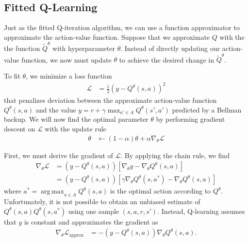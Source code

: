 \documentclass[11pt]{article}
\numberwithin{equation}{section}
\numberwithin{figure}{section}
\DeclareMathOperator*{\argmax}{arg\,max}
\begin{document}
\subsection{Fitted Q-Learning}
Just as the fitted Q-iteration algorithm, we can use a function approximator to
approximate the action-value function. Suppose that we approximate $Q$ with the
the function $\tilde{Q}^\theta$ with hyperparameter $\theta$. Instead of
directly updating our action-value function, we now must update $\theta$ to
achieve the desired change in $\tilde{Q}^\theta$.

To fit $\theta$, we minimize a loss function
\begin{align*}
    \mathcal{L} &= \frac{1}{2} \left( y - Q^\theta(s, a) \right)^2
\end{align*}
that penalizes deviation between the approximate action-value function
$Q^\theta(s, a)$ and the value $y = r + \gamma \max_{a' \in A} Q^\theta(s',
a')$ predicted by a Bellman backup. We will now find the optimal parameter
$\theta$ by performing gradient descent on $\mathcal{L}$ with the update rule
\begin{align}
    \theta &\gets (1 - \alpha) \theta + \alpha \nabla_\theta \mathcal{L}
    \label{eqn:qlearning-step}
\end{align}

First, we must derive the gradient of $\mathcal{L}$. By applying the chain
rule, we find
\begin{align*}
    \nabla_\theta \mathcal{L} &= \left(y - Q^\theta(s, a)\right) \left[
                                      \nabla_\theta y
                                    - \nabla_\theta Q^\theta(s, a) \right] \\
                              &= \left(y - Q^\theta(s, a)\right) \left[
                                      \gamma \nabla_\theta Q^\theta(s, a^*)
                                    - \nabla_\theta Q^\theta(s, a) \right]
\end{align*}
where $a^* = \argmax_{a \in A} Q^\theta(s, a)$ is the optimal action according
to $Q^\theta$. Unfortunately, it is not possible to obtain an unbiased estimate
of $Q^\theta(s, a) Q^\theta(s, a^*)$ using one sample $(s, a, r, s')$. Instead,
Q-learning assumes that $y$ is constant and approximates the gradient as
\begin{align}
    \nabla_\theta \mathcal{L}_\text{approx} &= -\left(y - Q^\theta(s, a)\right)
                                       \nabla_\theta Q^\theta(s, a).
    \label{eqn:qlearning-gradient}
\end{align}
\end{document}
